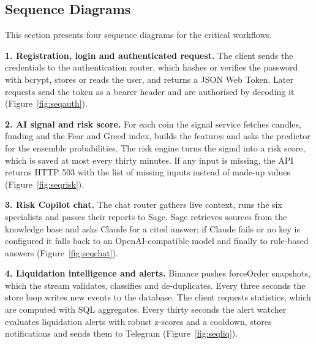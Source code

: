 
\subsection{Sequence Diagrams}
This section presents four sequence diagrams for the critical workflows.

\textbf{1. Registration, login and authenticated request.} The client sends the credentials to the authentication router, which hashes or verifies the password with bcrypt, stores or reads the user, and returns a JSON Web Token. Later requests send the token as a bearer header and are authorised by decoding it (Figure~\ref{fig:seqauth}).


\textbf{2. AI signal and risk score.} For each coin the signal service fetches candles, funding and the Fear and Greed index, builds the features and asks the predictor for the ensemble probabilities. The risk engine turns the signal into a risk score, which is saved at most every thirty minutes. If any input is missing, the API returns HTTP 503 with the list of missing inputs instead of made-up values (Figure~\ref{fig:seqrisk}).


\textbf{3. Risk Copilot chat.} The chat router gathers live context, runs the six specialists and passes their reports to Sage. Sage retrieves sources from the knowledge base and asks Claude for a cited answer; if Claude fails or no key is configured it falls back to an OpenAI-compatible model and finally to rule-based answers (Figure~\ref{fig:seqchat}).


\textbf{4. Liquidation intelligence and alerts.} Binance pushes forceOrder snapshots, which the stream validates, classifies and de-duplicates. Every three seconds the store loop writes new events to the database. The client requests statistics, which are computed with SQL aggregates. Every thirty seconds the alert watcher evaluates liquidation alerts with robust z-scores and a cooldown, stores notifications and sends them to Telegram (Figure~\ref{fig:seqliq}).

